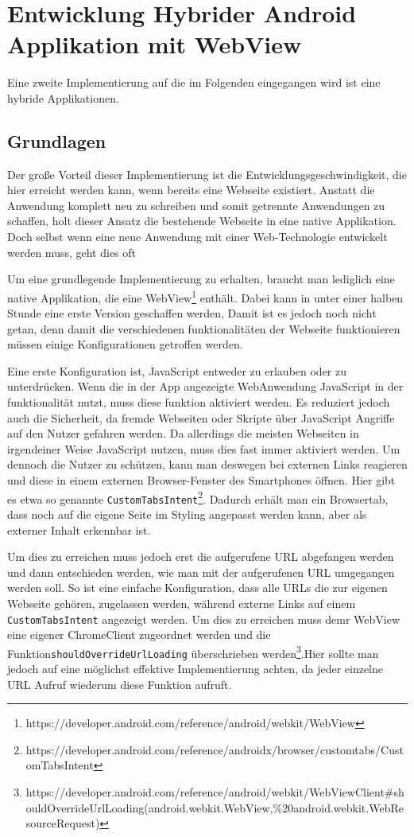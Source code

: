 \section{Entwicklung Hybrider Android Applikation mit WebView}

Eine zweite Implementierung auf die im Folgenden eingegangen wird ist eine hybride Applikationen. 

\subsection{Grundlagen}
Der große Vorteil dieser Implementierung ist die Entwicklungsgeschwindigkeit, die hier erreicht werden kann, wenn bereits eine Webseite existiert. Anstatt die Anwendung komplett neu zu schreiben und somit getrennte Anwendungen zu schaffen, holt dieser Ansatz die bestehende Webseite in eine native Applikation. Doch selbst wenn eine neue Anwendung mit einer Web-Technologie entwickelt werden muss, geht dies oft 

Um eine grundlegende Implementierung zu erhalten, braucht man lediglich eine native Applikation, die eine WebView\footnote{https://developer.android.com/reference/android/webkit/WebView} enthält. Dabei kann in unter einer halben Stunde eine erste Version geschaffen werden,
Damit ist es jedoch noch nicht getan, denn damit die verschiedenen funktionalitäten der Webseite funktionieren müssen einige Konfigurationen getroffen werden.

Eine erste Konfiguration ist, JavaScript entweder zu erlauben oder zu unterdrücken. Wenn die in der App angezeigte WebAnwendung JavaScript in der funktionalität nutzt, muss diese funktion aktiviert werden. Es reduziert jedoch auch die Sicherheit, da fremde Webseiten oder Skripte über JavaScript Angriffe auf den Nutzer gefahren werden. Da allerdings die meisten Webseiten in irgendeiner Weise JavaScript nutzen, muss dies fast immer aktiviert werden. Um dennoch die Nutzer zu schützen, kann man deswegen bei externen Links reagieren und diese in einem externen Browser-Fenster des Smartphones öffnen. Hier gibt es etwa so genannte \verb|CustomTabsIntent|\footnote{https://developer.android.com/reference/androidx/browser/customtabs/CustomTabsIntent}. Dadurch erhält man ein Browsertab, dass noch auf die eigene Seite im Styling angepasst werden kann, aber als externer Inhalt erkennbar ist.

Um dies zu erreichen muss jedoch erst die aufgerufene URL abgefangen werden und dann entschieden werden, wie man mit der aufgerufenen URL umgegangen werden soll. So ist eine einfache Konfiguration, dass alle URLs die zur eigenen Webseite gehören, zugelassen werden, während externe Links auf einem \verb|CustomTabsIntent| angezeigt werden. Um dies zu erreichen muss demr WebView eine eigener ChromeClient zugeordnet werden und die Funktion\verb|shouldOverrideUrlLoading| überschrieben werden\footnote{https://developer.android.com/reference/android/webkit/WebViewClient\#shouldOverrideUrlLoading(android.webkit.WebView,\%20android.webkit.WebResourceRequest)}.Hier sollte man jedoch auf eine möglichst effektive Implementierung achten, da jeder einzelne URL Aufruf wiederum diese Funktion aufruft.

